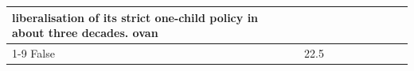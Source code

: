 \begin{table}[H]
\begin{tabular}{lllrlllll}
liberalisation of its strict one-child policy in about three decades. ovan \\
\cline{1-9}
False & 22.5%
\end{tabular}
\end{table}

